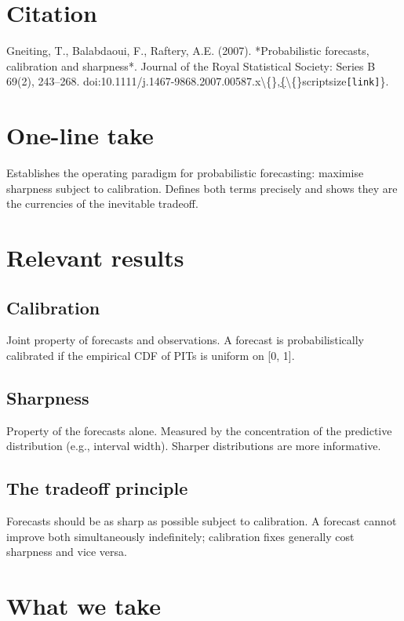 \documentclass[11pt,a4paper,openany]{report}
\begin{document}
\section{Citation}

Gneiting, T., Balabdaoui, F., Raftery, A.E. (2007). *Probabilistic
forecasts, calibration and sharpness*. Journal of the Royal Statistical
Society: Series B 69(2), 243–268.
doi:10.1111/j.1467-9868.2007.00587.x\textbackslash\{\},\href{https://doi.org/10.1111/j.1467-9868.2007.00587.x}\{\textbackslash\{\}scriptsize\texttt{[link]}\}.

\section{One-line take}

Establishes the operating paradigm for probabilistic forecasting:
maximise sharpness subject to calibration. Defines both terms precisely
and shows they are the currencies of the inevitable tradeoff.

\section{Relevant results}

\subsection{Calibration}

Joint property of forecasts and observations. A forecast is
probabilistically calibrated if the empirical CDF of PITs is uniform
on [0, 1].

\subsection{Sharpness}

Property of the forecasts alone. Measured by the concentration of the
predictive distribution (e.g., interval width). Sharper distributions
are more informative.

\subsection{The tradeoff principle}

Forecasts should be as sharp as possible subject to calibration. A
forecast cannot improve both simultaneously indefinitely; calibration
fixes generally cost sharpness and vice versa.

\section{What we take}
\end{document}
